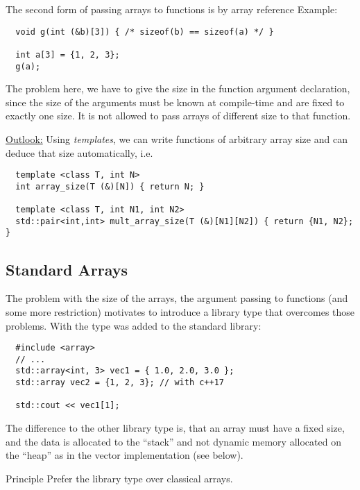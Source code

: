 The second form of passing arrays to functions is by array reference
%
%
Example:
\begin{verbatim}
  void g(int (&b)[3]) { /* sizeof(b) == sizeof(a) */ }

  int a[3] = {1, 2, 3};
  g(a);
\end{verbatim}
The problem here, we have to give the size in the function argument declaration, since the size of the arguments must be known
at compile-time and are fixed to exactly one size. It is not allowed to pass arrays of different size to that function.

\begin{rem}
\underline{Outlook:} Using \emph{templates}, we can write functions of arbitrary array size and can deduce that size automatically, i.e.
\begin{verbatim}
  template <class T, int N>
  int array_size(T (&)[N]) { return N; }

  template <class T, int N1, int N2>
  std::pair<int,int> mult_array_size(T (&)[N1][N2]) { return {N1, N2}; }
\end{verbatim}
\end{rem}


\subsection{Standard Arrays}
The problem with the size of the arrays, the argument passing to functions (and some more restriction) motivates to introduce a library type
that overcomes those problems. With \marginpar{[\cxx{11}]} the type  was added to the standard
library:
\begin{verbatim}
  #include <array>
  // ...
  std::array<int, 3> vec1 = { 1.0, 2.0, 3.0 };
  std::array vec2 = {1, 2, 3}; // with c++17

  std::cout << vec1[1];
\end{verbatim}

The difference to the other library type  is, that an array must have a fixed size, and the data is allocated to the ``stack''
and not dynamic memory allocated on the ``heap'' as in the vector implementation (see below).

\begin{guideline}{Principle}
  Prefer the library type  over classical arrays.
\end{guideline}


